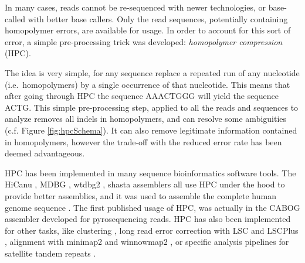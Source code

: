 \documentclass[
  11pt,
  twoside]{scrbook}
\begin{document}
In many cases, reads cannot be re-sequenced with newer technologies, or base-called with better base callers. Only the read sequences, potentially containing homopolymer errors, are available for usage. In order to account for this sort of error, a simple pre-processing trick was developed: \emph{homopolymer compression} (HPC).

The idea is very simple, for any sequence replace a repeated run of any nucleotide (i.e.~homopolymers) by a single occurrence of that nucleotide. This means that after going through HPC the sequence AAACTGGG will yield the sequence ACTG. This simple pre-processing step, applied to all the reads and sequences to analyze removes all indels in homopolymers, and can resolve some ambiguities (c.f. Figure \ref{fig:hpcSchema}). It can also remove legitimate information contained in homopolymers, however the trade-off with the reduced error rate has been deemed advantageous.

HPC has been implemented in many sequence bioinformatics software tools. The HiCanu \autocite{nurkHiCanuAccurateAssembly2020}, MDBG \autocite{ekimMinimizerspaceBruijnGraphs2021}, wtdbg2 \autocite{ruanFastAccurateLongread2020}, shasta \autocite{shafinNanoporeSequencingShasta2020} assemblers all use HPC under the hood to provide better assemblies, and it was used to assemble the complete human genome sequence \autocite{nurk2022}. The first published usage of HPC, was actually in the CABOG assembler \autocite{millerAggressiveAssemblyPyrosequencing2008} developed for pyrosequencing reads. HPC has also been implemented for other tasks, like clustering \autocite{sahlinNovoClusteringLongRead2020}, long read error correction with LSC \autocite{auImprovingPacBioLong2012} and LSCPlus \autocite{huLSCplusFastSolution2016}, alignment with minimap2 \autocite{liMinimap2PairwiseAlignment2018} and winnowmap2 \autocite{jainWeightedMinimizerSampling2020}, or specific analysis pipelines for satellite tandem repeats \autocite{vannesteForensicSTRAnalysis2012}.
\end{document}
